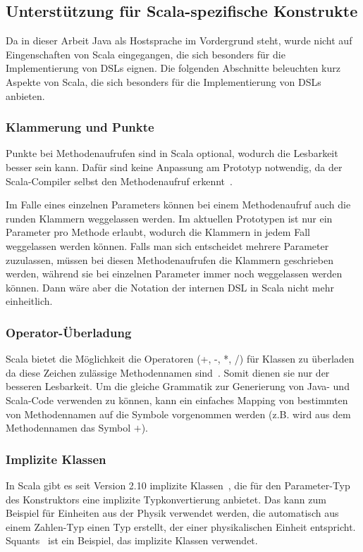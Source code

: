 \documentclass[../InterneDSLs.tex]{subfiles}
\begin{document}
\subsection{Unterstützung für Scala-spezifische Konstrukte}
Da in dieser Arbeit Java als Hostsprache im Vordergrund steht, wurde nicht auf Eingenschaften von Scala eingegangen, die sich besonders für die Implementierung von DSLs eignen. Die folgenden Abschnitte beleuchten kurz Aspekte von Scala, die sich besonders für die Implementierung von DSLs anbieten.

\subsubsection{Klammerung und Punkte}
Punkte bei Methodenaufrufen sind in Scala optional, wodurch die Lesbarkeit besser sein kann. Dafür sind keine Anpassung am Prototyp notwendig, da der Scala-Compiler selbst den Methodenaufruf erkennt~\cite{methodinvocation.scaladoc}.

Im Falle eines einzelnen Parameters können bei einem Methodenaufruf auch die runden Klammern weggelassen werden. Im aktuellen Prototypen ist nur ein Parameter pro Methode erlaubt, wodurch die Klammern in jedem Fall weggelassen werden können. Falls man sich entscheidet mehrere Parameter zuzulassen, müssen bei diesen Methodenaufrufen die Klammern geschrieben werden, während sie bei einzelnen Parameter immer noch weggelassen werden können. Dann wäre aber die Notation der internen DSL in Scala nicht mehr einheitlich.

\subsubsection{Operator-Überladung}
Scala bietet die Möglichkeit die Operatoren (+, -, *, /) für Klassen zu überladen da diese Zeichen zulässige Methodennamen sind~\cite{operators.scaladoc}. Somit dienen sie nur der besseren Lesbarkeit. Um die gleiche Grammatik zur Generierung von Java- und Scala-Code verwenden zu können, kann ein einfaches Mapping von bestimmten von Methodennamen auf die Symbole vorgenommen werden (z.B. wird aus dem Methodennamen  das Symbol $+$).

\subsubsection{Implizite Klassen}
In Scala gibt es seit Version 2.10 implizite Klassen~\cite{implicitclasses.scaladoc}, die für den Parameter-Typ des Konstruktors eine implizite Typkonvertierung anbietet. Das kann zum Beispiel für Einheiten aus der Physik verwendet werden, die automatisch aus einem Zahlen-Typ einen Typ erstellt, der einer physikalischen Einheit entspricht. Squants~\cite{squants.github} ist ein Beispiel, das implizite Klassen verwendet.
\end{document}
